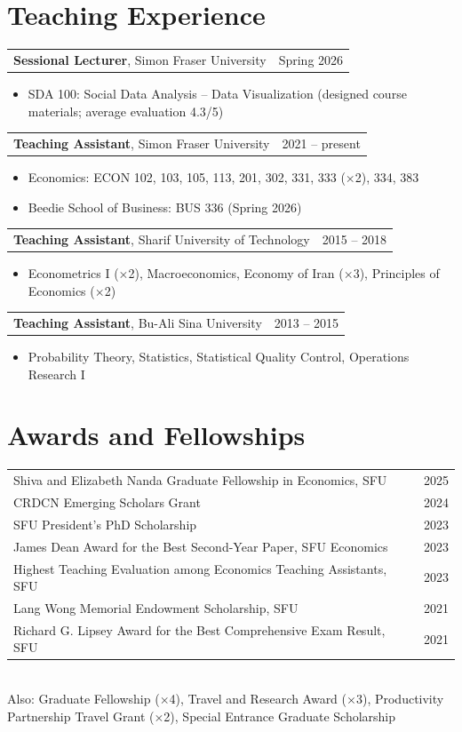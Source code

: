 \documentclass[11pt,letterpaper]{article}
\makeatletter
\newcommand{\entry}[2]{\noindent\begin{tabularx}{\linewidth}{@{}X r@{}}#1 & #2\end{tabularx}\par}
\makeatother
\begin{document}
\section{Teaching Experience}
\entry{\textbf{Sessional Lecturer}, Simon Fraser University}{Spring 2026}
\begin{itemize}
  \item SDA 100: Social Data Analysis -- Data Visualization (designed course materials; average evaluation 4.3/5)
\end{itemize}
\entry{\textbf{Teaching Assistant}, Simon Fraser University}{2021 -- present}
\begin{itemize}
  \item Economics: ECON 102, 103, 105, 113, 201, 302, 331, 333 ($\times$2), 334, 383
  \item Beedie School of Business: BUS 336 (Spring 2026)
\end{itemize}
\entry{\textbf{Teaching Assistant}, Sharif University of Technology}{2015 -- 2018}
\begin{itemize}
  \item Econometrics I ($\times$2), Macroeconomics, Economy of Iran ($\times$3), Principles of Economics ($\times$2)
\end{itemize}
\entry{\textbf{Teaching Assistant}, Bu-Ali Sina University}{2013 -- 2015}
\begin{itemize}
  \item Probability Theory, Statistics, Statistical Quality Control, Operations Research I
\end{itemize}

\section{Awards and Fellowships}
\begin{tabularx}{\linewidth}{@{}X r@{}}
Shiva and Elizabeth Nanda Graduate Fellowship in Economics, SFU & 2025 \\
CRDCN Emerging Scholars Grant & 2024 \\
SFU President's PhD Scholarship & 2023 \\
James Dean Award for the Best Second-Year Paper, SFU Economics & 2023 \\
Highest Teaching Evaluation among Economics Teaching Assistants, SFU & 2023 \\
Lang Wong Memorial Endowment Scholarship, SFU & 2021 \\
Richard G. Lipsey Award for the Best Comprehensive Exam Result, SFU & 2021 \\
\end{tabularx}\\[0.3em]
Also: Graduate Fellowship ($\times$4), Travel and Research Award ($\times$3), Productivity Partnership Travel Grant ($\times$2), Special Entrance Graduate Scholarship
\end{document}
